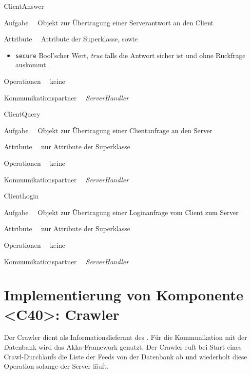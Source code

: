 \begin{class}{10}{ClientAnswer}
\item[Aufgabe]~\
Objekt zur Übertragung einer Serverantwort an den Client
\item[Attribute]~\
Attribute der Superklasse, sowie
\begin{itemize}
    \item \texttt{secure} Bool'scher Wert, \textit{true} falls die Antwort
    sicher ist und ohne Rückfrage auskommt.
\end{itemize}
\item[Operationen]~\
keine
\item[Kommunikationspartner]~\
\textit{ServerHandler}
\end{class}

\begin{class}{10}{ClientQuery}
\item[Aufgabe]~\
Objekt zur Übertragung einer Clientanfrage an den Server
\item[Attribute]~\
nur Attribute der Superklasse
\item[Operationen]~\
keine
\item[Kommunikationspartner]~\
\textit{ServerHandler}
\end{class}

\begin{class}{10}{ClientLogin}
\item[Aufgabe]~\
Objekt zur Übertragung einer Loginanfrage vom Client zum Server
\item[Attribute]~\
nur Attribute der Superklasse
\item[Operationen]~\
keine
\item[Kommunikationspartner]~\
\textit{ServerHandler}
\end{class}

\FloatBarrier





\section{Implementierung von Komponente <C40>: Crawler}

Der Crawler dient als Informationslieferant des \NewsGenies. Für die
Kommunikation mit der Datenbank wird das Akka-Framework genutzt. Der Crawler
ruft bei Start eines Crawl-Durchlaufs die Liste der Feeds von der Datenbank
ab und wiederholt diese Operation solange der Server läuft.


